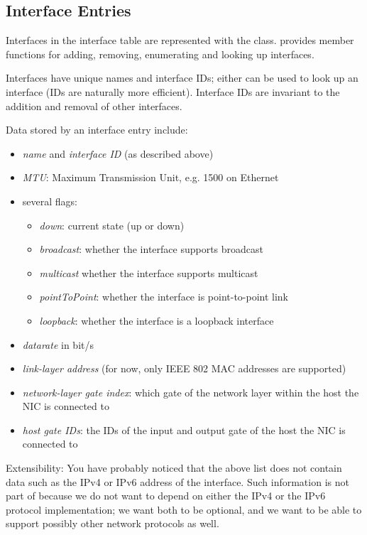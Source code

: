 \subsection{Interface Entries}

Interfaces in the interface table are represented with the
 class.  provides member
functions for adding, removing, enumerating and looking up interfaces.

Interfaces have unique names and interface IDs; either can be used to look up
an interface (IDs are naturally more efficient). Interface IDs are invariant to
the addition and removal of other interfaces.

Data stored by an interface entry include:

\begin{itemize}
  \item \textit{name} and \textit{interface ID} (as described above)
  \item \textit{MTU}: Maximum Transmission Unit, e.g. 1500 on Ethernet
  \item several flags:
    \begin{itemize}
      \item \textit{down}: current state (up or down)
      \item \textit{broadcast}: whether the interface supports broadcast
      \item \textit{multicast} whether the interface supports multicast
      \item \textit{pointToPoint}: whether the interface is point-to-point link
      \item \textit{loopback}: whether the interface is a loopback interface
    \end{itemize}
  \item \textit{datarate} in bit/s
  \item \textit{link-layer address} (for now, only IEEE 802 MAC addresses are supported)
  \item \textit{network-layer gate index}: which gate of the network layer within the host the NIC is connected to
  \item \textit{host gate IDs}: the IDs of the input and output gate of the host the NIC is connected to
\end{itemize}

Extensibility: You have probably noticed that the above list does not
contain data such as the IPv4 or IPv6 address of the interface. Such
information is not part of  because we do not want
 to depend on either the IPv4 or the IPv6 protocol
implementation; we want both to be optional, and we want
 to be able to support possibly other network
protocols as well.

